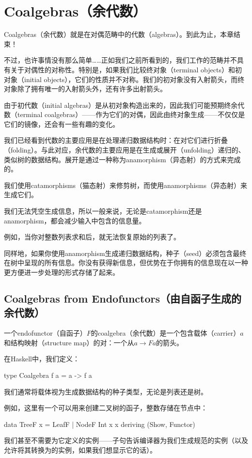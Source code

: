 \documentclass[DaoFP]{subfiles}
\begin{document}
    \setcounter{chapter}{12}

    \chapter{Coalgebras（余代数）}

    Coalgebras（余代数）就是在对偶范畴中的代数（algebras）。到此为止，本章结束！

    不过，也许事情没有那么简单……正如我们之前所看到的，我们工作的范畴并不具有关于对偶性的对称性。特别是，如果我们比较终对象（terminal objects）和初对象（initial objects），它们的性质并不对称。我们的初对象没有入射箭头，而终对象除了拥有唯一的入射箭头外，还有许多出射箭头。

    由于初代数（initial algebras）是从初对象构造出来的，因此我们可能预期终余代数（terminal coalgebras）——作为它们的对偶，因此由终对象生成——不仅仅是它们的镜像，还会有一些有趣的变化。

    我们已经看到代数的主要应用是在处理递归数据结构时：在对它们进行折叠（folding）。与此对应，余代数的主要应用是在生成或展开（unfolding）递归的、类似树的数据结构。展开是通过一种称为anamorphism（异态射）的方式来完成的。

    我们使用catamorphisms（猫态射）来修剪树，而使用anamorphisms（异态射）来生成它们。

    我们无法凭空生成信息，所以一般来说，无论是catamorphism还是anamorphism，都会减少输入中包含的信息量。

    例如，当你对整数列表求和后，就无法恢复原始的列表了。

    同样地，如果你使用anamorphism生成递归数据结构，种子（seed）必须包含最终在树中呈现的所有信息。你没有获得新信息，但优势在于你拥有的信息现在以一种更方便进一步处理的形式存储了起来。

    \section{Coalgebras from Endofunctors（由自函子生成的余代数）}

    一个endofunctor（自函子）$F$的coalgebra（余代数）是一个包含载体（carrier）$a$和结构映射（structure map）的对：一个从$a \to F a$的箭头。

    在Haskell中，我们定义：
    \begin{haskell}
        type Coalgebra f a = a -> f a
    \end{haskell}
    我们通常将载体视为生成数据结构的种子类型，无论是列表还是树。

    例如，这里有一个可以用来创建二叉树的函子，整数存储在节点中：
    \begin{haskell}
        data TreeF x = LeafF | NodeF Int x x
        deriving (Show, Functor)
    \end{haskell}
    我们甚至不需要为它定义的实例——子句告诉编译器为我们生成规范的实例（以及允许将其转换为的实例，如果我们想显示它的话）。
\end{document}
